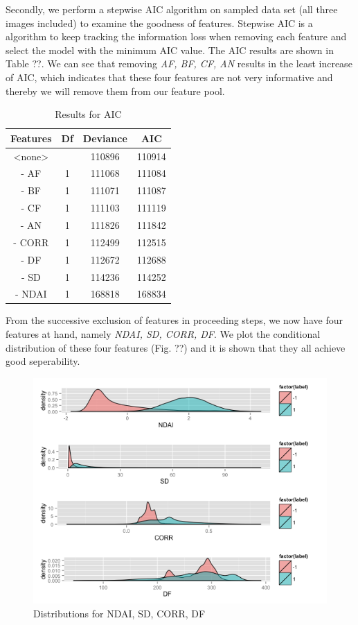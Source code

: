\documentclass[english]{article}\usepackage{graphicx, color}
\numberwithin{equation}{section}
\numberwithin{figure}{section}
\begin{document}
Secondly, we perform a stepwise AIC algorithm on sampled data set (all three images included) to examine the goodness of features. Stepwise AIC is a algorithm to keep tracking the information loss when removing each feature and select the model with the minimum AIC value. The AIC results are shown in Table ??. We can see that removing \textit{AF, BF, CF, AN} results in the least increase of AIC, which indicates that these four features are not very informative and thereby we will remove them from our feature pool.
\begin{table}[!h]
\centering
\begin{tabular}{*{4}{c}}
Features & Df & Deviance & AIC\\
       \hline
<none>   &    & 110896   & 110914\\
- AF     & 1  & 111068   & 111084\\
- BF     & 1  & 111071   & 111087\\
- CF     & 1  & 111103   & 111119\\
- AN     & 1  & 111826   & 111842\\
- CORR   & 1  & 112499   & 112515\\
- DF     & 1  & 112672   & 112688\\
- SD     & 1  & 114236   & 114252\\
- NDAI   & 1  & 168818   & 168834\\

\end{tabular}
\caption{Results for AIC}
\end{table}

From the successive exclusion of features in proceeding steps, we now have four features at hand, namely \textit{NDAI, SD, CORR, DF}. We plot the conditional distribution of these four features (Fig. ??) and it is shown that they all achieve good seperability.

\begin{figure}[!h]
  \begin{center}
    \includegraphics[width=\columnwidth]{figures/ConditionalDistribution.png}
  \end{center}
  \caption{Distributions for NDAI, SD, CORR, DF}
  \label{fig:CD}
\end{figure}
\end{document}
